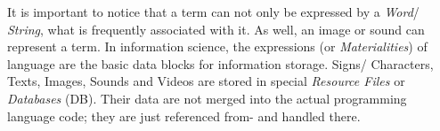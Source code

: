 It is important to notice that a term can not only be expressed by a
\emph{Word}/ \emph{String}, what is frequently associated with it. As well, an
image or sound can represent a term. In information science, the expressions
(or \emph{Materialities}) of language are the basic data blocks for information
storage. Signs/ Characters, Texts, Images, Sounds and Videos are stored in
special \emph{Resource Files} or \emph{Databases} (DB). Their data are not
merged into the actual programming language code; they are just referenced from-
and handled there.
